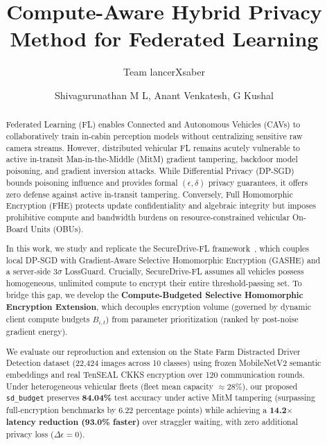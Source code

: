 \documentclass[acmtog,nonacm]{acmart}
\begin{document}
\title{Compute-Aware Hybrid Privacy Method for Federated Learning}
\subtitle{Team lancerXsaber}

\author{Shivagurunathan M L, Anant Venkatesh, G Kushal}

\begin{abstract}
Federated Learning (FL) enables Connected and Autonomous Vehicles (CAVs) to collaboratively train in-cabin perception models without centralizing sensitive raw camera streams. However, distributed vehicular FL remains acutely vulnerable to active in-transit Man-in-the-Middle (MitM) gradient tampering, backdoor model poisoning, and gradient inversion attacks. While Differential Privacy (DP-SGD) bounds poisoning influence and provides formal $(\epsilon, \delta)$ privacy guarantees, it offers zero defense against active in-transit tampering. Conversely, Full Homomorphic Encryption (FHE) protects update confidentiality and algebraic integrity but imposes prohibitive compute and bandwidth burdens on resource-constrained vehicular On-Board Units (OBUs).

In this work, we study and replicate the SecureDrive-FL framework~\cite{gul2026securedrive}, which couples local DP-SGD with Gradient-Aware Selective Homomorphic Encryption (GASHE) and a server-side $3\sigma$ LossGuard. Crucially, SecureDrive-FL assumes all vehicles possess homogeneous, unlimited compute to encrypt their entire threshold-passing set. To bridge this gap, we develop the \textbf{Compute-Budgeted Selective Homomorphic Encryption Extension}, which decouples encryption volume (governed by dynamic client compute budgets $B_{i,t}$) from parameter prioritization (ranked by post-noise gradient energy).

We evaluate our reproduction and extension on the State Farm Distracted Driver Detection dataset (22,424 images across 10 classes) using frozen MobileNetV2 semantic embeddings and real TenSEAL CKKS encryption over 120 communication rounds. Under heterogeneous vehicular fleets (fleet mean capacity $\approx 28\%$), our proposed \texttt{sd\_budget} preserves \textbf{84.04\%} test accuracy under active MitM tampering (surpassing full-encryption benchmarks by 6.22 percentage points) while achieving a \textbf{14.2$\times$ latency reduction (93.0\% faster)} over straggler waiting, with zero additional privacy loss ($\Delta\epsilon=0$).
\end{abstract}

\maketitle
\pagestyle{fancy}
\fancyhf{}
\fancyfoot[C]{\thepage}
\renewcommand{\headrulewidth}{0pt}
\renewcommand{\footrulewidth}{0pt}
\end{document}
